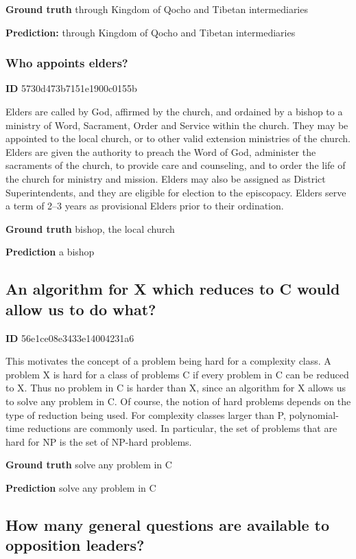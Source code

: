 \documentclass{article} \usepackage{iclr2017_conference,times}
\begin{document}
\textbf{Ground truth}
through Kingdom of Qocho and Tibetan intermediaries

\textbf{Prediction:}
through Kingdom of Qocho and Tibetan intermediaries


\subsubsection*{Who appoints elders?}

\textbf{ID} 5730d473b7151e1900c0155b

Elders are called by God, affirmed by the church, and ordained by a bishop to a ministry of Word, Sacrament, Order and Service within the church. They may be appointed to the local church, or to other valid extension ministries of the church. Elders are given the authority to preach the Word of God, administer the sacraments of the church, to provide care and counseling, and to order the life of the church for ministry and mission. Elders may also be assigned as District Superintendents, and they are eligible for election to the episcopacy. Elders serve a term of 2–3 years as provisional Elders prior to their ordination.

\textbf{Ground truth}
bishop, the local church

\textbf{Prediction}
a bishop



\subsection*{An algorithm for X which reduces to C would allow us to do what?}

\textbf{ID} 56e1ce08e3433e14004231a6

This motivates the concept of a problem being hard for a complexity class. A problem X is hard for a class of problems C if every problem in C can be reduced to X. Thus no problem in C is harder than X, since an algorithm for X allows us to solve any problem in C. Of course, the notion of hard problems depends on the type of reduction being used. For complexity classes larger than P, polynomial-time reductions are commonly used. In particular, the set of problems that are hard for NP is the set of NP-hard problems.

\textbf{Ground truth}
solve any problem in C

\textbf{Prediction}
solve any problem in C



\subsection*{How many general questions are available to opposition leaders?}
\end{document}
